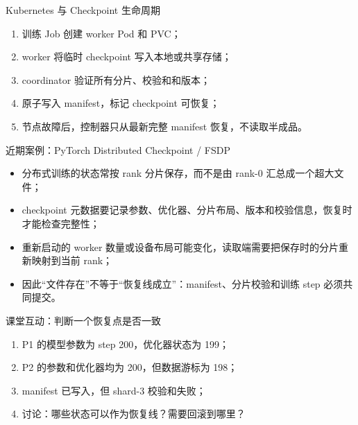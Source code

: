 \documentclass[UTF8,fontset=none,aspectratio=169,10pt]{beamer}
\begin{document}
\begin{frame}{Kubernetes 与 Checkpoint 生命周期}
\begin{enumerate}
  \item 训练 Job 创建 worker Pod 和 PVC；
  \item worker 将临时 checkpoint 写入本地或共享存储；
  \item coordinator 验证所有分片、校验和和版本；
  \item 原子写入 manifest，标记 checkpoint 可恢复；
  \item 节点故障后，控制器只从最新完整 manifest 恢复，不读取半成品。
\end{enumerate}
\end{frame}

\begin{frame}{近期案例：PyTorch Distributed Checkpoint / FSDP}
\begin{itemize}
  \item 分布式训练的状态常按 rank 分片保存，而不是由 rank-0 汇总成一个超大文件；
  \item checkpoint 元数据要记录参数、优化器、分片布局、版本和校验信息，恢复时才能检查完整性；
  \item 重新启动的 worker 数量或设备布局可能变化，读取端需要把保存时的分片重新映射到当前 rank；
  \item 因此“文件存在”不等于“恢复线成立”：manifest、分片校验和训练 step 必须共同提交。
\end{itemize}
\vfill
{}
\end{frame}

\begin{frame}{课堂互动：判断一个恢复点是否一致}
\begin{enumerate}
  \item P1 的模型参数为 step 200，优化器状态为 199；
  \item P2 的参数和优化器均为 200，但数据游标为 198；
  \item manifest 已写入，但 shard-3 校验和失败；
  \item 讨论：哪些状态可以作为恢复线？需要回滚到哪里？
\end{enumerate}
\vfill
{}
\end{frame}

\end{document}

